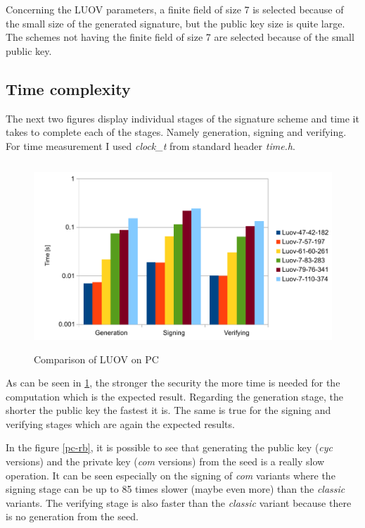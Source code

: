 \documentclass[thesis=M,english]{FITthesis}[2019/12/23]
\begin{document}
\bigskip
\noindent
Concerning the LUOV parameters, a finite field of size 7 is selected because of the small size of the generated signature, but the public key size is quite large. The schemes not having the finite field of size 7 are selected because of the small public key.

\subsection{Time complexity} \label{time-complex-pc}
The next two figures display individual stages of the signature scheme and time it takes to complete each of the stages. Namely generation, signing and verifying. For time measurement I used \textit{clock\_t} from standard header \textit{time.h}.
\begin{figure}[H]
\centering
\includegraphics[width=13cm,height=7cm]{images/pc-luov.pdf}
\caption{Comparison of LUOV on PC}
\label{pc-luov}
\end{figure}

\noindent
As can be seen in \ref{pc-luov}, the stronger the security the more time is needed for the computation which is the expected result. Regarding the generation stage, the shorter the public key the fastest it is. The same is true for the signing and verifying stages which are again the expected results. 

\bigskip
\noindent
In the figure \ref{pc-rb}, it is possible to see that generating the public key (\textit{cyc} versions) and the private key (\textit{com} versions) from the seed is a really slow operation. It can be seen especially on the signing of \textit{com} variants where the signing stage can be up to 85 times slower (maybe even more) than the \textit{classic} variants. The verifying stage is also faster than the \textit{classic} variant because there is no generation from the seed. 
\end{document}
